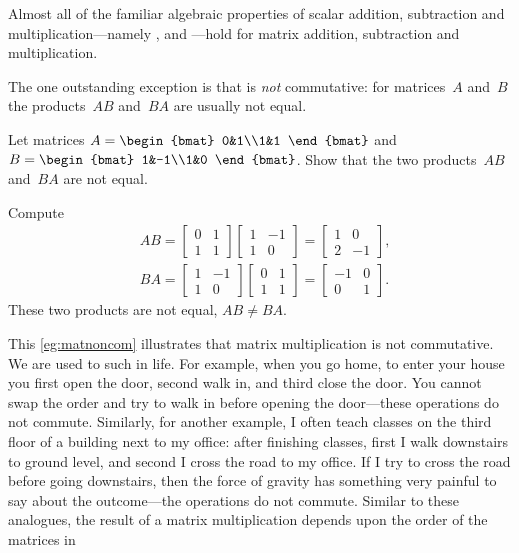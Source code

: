 Almost all of the familiar algebraic properties of scalar addition, 
subtraction and multiplication---namely ,  and ---hold for matrix addition, subtraction and multiplication.

The one outstanding exception is that  is \emph{not} commutative: for matrices~\(A\) and~\(B\) the products~\(AB\) and~\(BA\) are usually not equal.
\begin{example} \label{eg:matnoncom}
Let matrices \(A=\begin{bmat} 0&1\\1&1 \end{bmat}\) and \(B=\begin{bmat} 1&-1\\1&0 \end{bmat}\).  
Show that the two products~\(AB\) and~\(BA\) are not equal.
\begin{solution} 
Compute
\begin{align*}&
AB=\begin{bmatrix} 0&1\\1&1 \end{bmatrix}
\begin{bmatrix} 1&-1\\1&0 \end{bmatrix}
=\begin{bmatrix} 1&0\\2&-1 \end{bmatrix},
\\&
BA=\begin{bmatrix} 1&-1\\1&0 \end{bmatrix}
\begin{bmatrix} 0&1\\1&1 \end{bmatrix}
=\begin{bmatrix} -1&0\\0&1 \end{bmatrix}.
\end{align*}
These two products are not equal, \(AB\neq BA\).
\end{solution}
\end{example}

This \cref{eg:matnoncom} illustrates that matrix multiplication is not commutative.
We are used to such  in life.
For example, when you go home, to enter your house you first open the door, second walk in, and third close the door. 
You cannot swap the order and try to walk in before opening the door---these operations do not commute.
Similarly, for another example, I often teach classes on the third floor of a building next to my office: after finishing classes, first I walk downstairs to ground level, and second I cross the road to my office.
If I try to cross the road before going downstairs, then the force of gravity has something very painful to say about the outcome---the operations do not commute.
Similar to these analogues, the result of a matrix multiplication depends upon the order of the matrices in 


